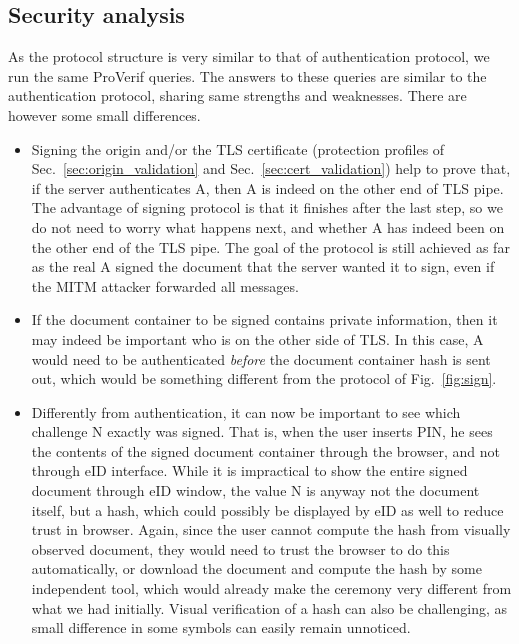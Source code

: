 \subsection{Security analysis}

As the protocol structure is very similar to that of authentication protocol, we run the same ProVerif queries. The answers to these queries are similar to the authentication protocol, sharing same strengths and weaknesses. There are however some small differences.

\begin{itemize}

\item Signing the origin and/or the TLS certificate (protection profiles of Sec.~\ref{sec:origin_validation} and Sec.~\ref{sec:cert_validation}) help to prove that, if the server authenticates A, then A is indeed on the other end of TLS pipe. The advantage of signing protocol is that it finishes after the last step, so we do not need to worry what happens next, and whether A has indeed been on the other end of the TLS pipe. The goal of the protocol is still achieved as far as the real A signed the document that the server wanted it to sign, even if the MITM attacker forwarded all messages.

\item If the document container to be signed contains private information, then it may indeed be important who is on the other side of TLS. In this case, A would need to be authenticated \emph{before} the document container hash is sent out, which would be something different from the protocol of Fig.~\ref{fig:sign}.
\item
Differently from authentication, it can now be important to see which challenge N exactly was signed. That is, when the user inserts PIN, he sees the contents of the signed document container through the browser, and not through eID interface. While it is impractical to show the entire signed document through eID window, the value N is anyway not the document itself, but a hash, which could possibly be displayed by eID as well to reduce trust in browser. Again, since the user cannot compute the hash from visually observed document, they would need to trust the browser to do this automatically, or download the document and compute the hash by some independent tool, which would already make the ceremony very different from what we had initially. Visual verification of a hash can also be challenging, as small difference in some symbols can easily remain unnoticed.
\end{itemize}


